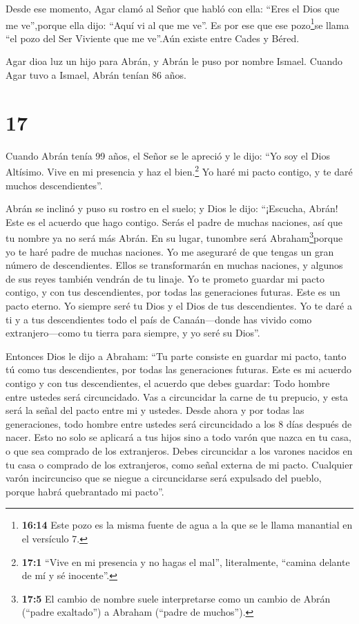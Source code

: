  Desde ese momento, Agar clamó al Señor que habló con ella:
``Eres el Dios que me ve'',porque ella dijo: ``Aquí vi al que me ve''.
 Es por ese que ese pozo\footnote{\textbf{16:14} Este pozo
  es la misma fuente de agua a la que se le llama manantial en el
  versículo 7.}se llama ``el pozo del Ser Viviente que me ve''.Aún
existe entre Cades y Béred.

 Agar dioa luz un hijo para Abrán, y Abrán le puso por
nombre Ismael.  Cuando Agar tuvo a Ismael, Abrán tenían 86
años.

\hypertarget{section-16}{%
\section{17}\label{section-16}}

 Cuando Abrán tenía 99 años, el Señor se le apreció y le
dijo: ``Yo soy el Dios Altísimo. Vive en mi presencia y haz el
bien.\footnote{\textbf{17:1} ``Vive en mi presencia y no hagas el mal'',
  literalmente, ``camina delante de mí y sé inocente''.}  Yo
haré mi pacto contigo, y te daré muchos descendientes''.

 Abrán se inclinó y puso su rostro en el suelo; y Dios le
dijo:  ``¡Escucha, Abrán! Este es el acuerdo que hago
contigo. Serás el padre de muchas naciones,  así que tu
nombre ya no será más Abrán. En su lugar, tunombre será
Abraham\footnote{\textbf{17:5} El cambio de nombre suele interpretarse
  como un cambio de Abrán (``padre exaltado'') a Abraham (``padre de
  muchos'').}porque yo te haré padre de muchas naciones.  Yo
me aseguraré de que tengas un gran número de descendientes. Ellos se
transformarán en muchas naciones, y algunos de sus reyes también vendrán
de tu linaje.  Yo te prometo guardar mi pacto contigo, y con
tus descendientes, por todas las generaciones futuras. Este es un pacto
eterno. Yo siempre seré tu Dios y el Dios de tus descendientes.
 Yo te daré a ti y a tus descendientes todo el país de
Canaán---donde has vivido como extranjero---como tu tierra para siempre,
y yo seré su Dios''.

 Entonces Dios le dijo a Abraham: ``Tu parte consiste en
guardar mi pacto, tanto tú como tus descendientes, por todas las
generaciones futuras.  Este es mi acuerdo contigo y con tus
descendientes, el acuerdo que debes guardar: Todo hombre entre ustedes
será circuncidado.  Vas a circuncidar la carne de tu
prepucio, y esta será la señal del pacto entre mi y ustedes.
 Desde ahora y por todas las generaciones, todo hombre
entre ustedes será circuncidado a los 8 días después de nacer. Esto no
solo se aplicará a tus hijos sino a todo varón que nazca en tu casa, o
que sea comprado de los extranjeros.  Debes circuncidar a
los varones nacidos en tu casa o comprado de los extranjeros, como señal
externa de mi pacto.  Cualquier varón incircunciso que se
niegue a circuncidarse será expulsado del pueblo, porque habrá
quebrantado mi pacto''.

